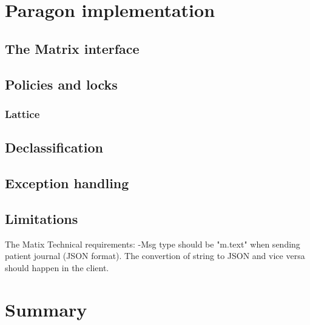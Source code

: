 \section{Paragon implementation}

\subsection{The Matrix interface}


\subsection{Policies and locks}


\subsubsection{Lattice}

\subsection{Declassification}

\subsection{Exception handling}


\subsection{Limitations}

The Matix 
Technical requirements:
-Msg type should be "m.text" when sending patient journal (JSON format). The convertion of string to JSON and vice versa should happen in the client.

\section{Summary}
